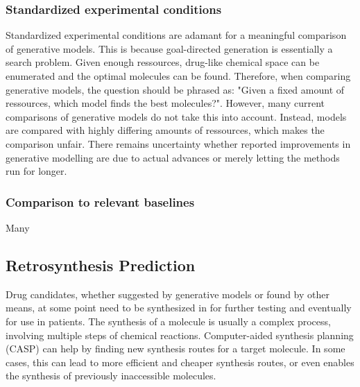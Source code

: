 \subsubsection{Standardized experimental conditions}
Standardized experimental conditions are adamant for a meaningful comparison of
generative models. This is because goal-directed generation is essentially a 
search problem. %
Given enough ressources, drug-like chemical space can be enumerated and the
optimal molecules can be found. Therefore, when comparing generative models, the 
question should be phrased as: "Given a fixed amount of ressources, which model
finds the best molecules?". However, many current comparisons of generative
models do not take this into account. Instead, models are compared with highly 
differing amounts of ressources, which makes the comparison unfair.
There remains uncertainty whether reported improvements in generative modelling 
are due to actual advances or merely letting the methods run for longer.

\subsubsection{Comparison to relevant baselines}
Many 



\subsection{Retrosynthesis Prediction\label{sec:retrosynthesis}}
Drug candidates, whether suggested by generative models or found by other means,
at some point need to be synthesized in for further testing and 
eventually for use in patients. The synthesis of a molecule is usually a complex
process, involving multiple steps of chemical reactions. Computer-aided synthesis 
planning (CASP) can help by finding new synthesis routes for a target molecule.
In some cases, this can lead to more efficient and cheaper synthesis routes, or
even enables the synthesis of previously inaccessible molecules.

